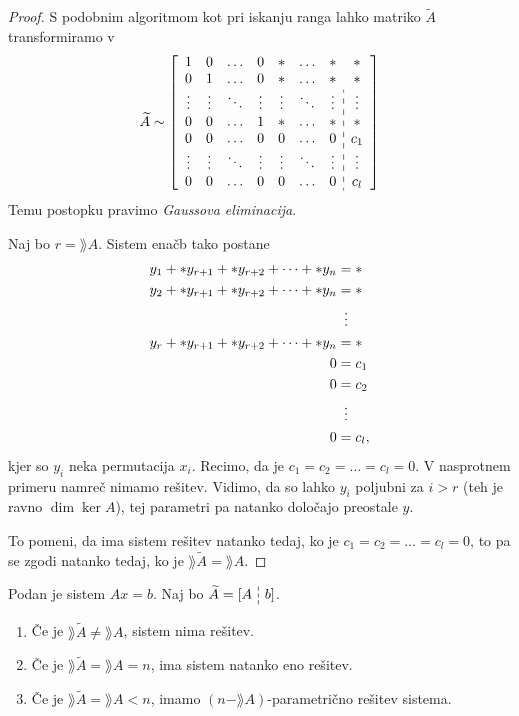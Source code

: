 \documentclass[12pt, a4paper]{article}
\begin{document}
\begin{proof}
S podobnim algoritmom kot pri iskanju ranga lahko matriko $\widetilde{A}$ transformiramo v
\[
\widetilde{A}\sim
\left[\begin{array}{ccccccc:c}
1      & 0      & \dots  & 0      & *      & \dots  & *      & *      \\ 
0      & 1      & \dots  & 0      & *      & \dots  & *      & *      \\ 
\vdots & \vdots & \ddots & \vdots & \vdots & \ddots & \vdots & \vdots \\ 
0      & 0      & \dots  & 1      & *      & \dots  & *      & *      \\ 
0      & 0      & \dots  & 0      & 0      & \dots  & 0      & c_1    \\ 
\vdots & \vdots & \ddots & \vdots & \vdots & \ddots & \vdots & \vdots \\ 
0      & 0      & \dots  & 0      & 0      & \dots  & 0      & c_l
\end{array}\right]
\]
Temu postopku pravimo \emph{Gaussova eliminacija}.

Naj bo $r=\rang A$. Sistem enačb tako postane
\begin{align*}
y_1+*y_{r+1}+*y_{r+2}+\dots+*y_n&=*
\\
y_2+*y_{r+1}+*y_{r+2}+\dots+*y_n&=*
\\
&\vdotswithin{=}
\\
y_r+*y_{r+1}+*y_{r+2}+\dots+*y_n&=*
\\
0&=c_1
\\
0&=c_2
\\
&\vdotswithin{=}
\\
0&=c_l,
\end{align*}
kjer so $y_i$ neka permutacija $x_i$. Recimo, da je $c_1=c_2=\dots=c_l=0$. V nasprotnem primeru namreč nimamo rešitev. Vidimo, da so lahko $y_i$ poljubni za $i>r$ (teh je ravno $\dim\ker A$), tej parametri pa natanko določajo preostale $y$.

To pomeni, da ima sistem rešitev natanko tedaj, ko je $c_1=c_2=\dots=c_l=0$, to pa se zgodi natanko tedaj, ko je $\rang\widetilde{A}=\rang A$.
\end{proof}

\begin{posledica}
Podan je sistem $Ax=b$. Naj bo $\widetilde{A}=[A\dashline b]$.

\begin{enumerate}
\item Če je $\rang\widetilde{A}\ne\rang A$, sistem nima rešitev.
\item Če je $\rang\widetilde{A}=\rang A=n$, ima sistem natanko eno rešitev.
\item Če je $\rang\widetilde{A}=\rang A<n$, imamo $(n-\rang A)$-parametrično rešitev sistema.
\end{enumerate}
\end{posledica}
\end{document}
